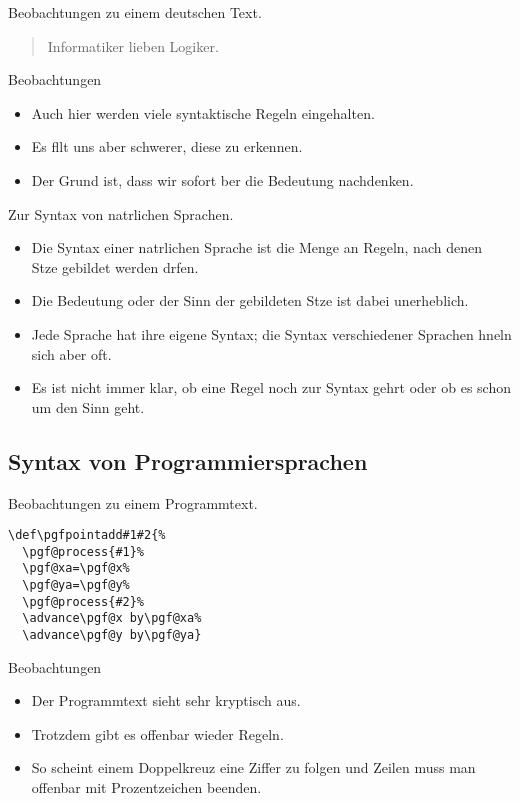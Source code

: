 \begin{frame}{Beobachtungen zu einem deutschen Text.}
  \begin{quotation}
    Informatiker lieben Logiker.
  \end{quotation}

  \bigskip
  \begin{block}{Beobachtungen}
    \begin{itemize}
    \item Auch hier werden viele syntaktische Regeln eingehalten.
    \item Es fllt uns aber \alert{schwerer}, diese zu erkennen.
    \item Der Grund ist, dass wir \alert{sofort ber die Bedeutung
        nachdenken}. 
    \end{itemize}
  \end{block}
\end{frame}

\begin{frame}{Zur Syntax von natrlichen Sprachen.}
  \begin{itemize}
  \item 
    Die \alert{Syntax} einer natrlichen Sprache ist die Menge an
    \alert{Regeln}, nach denen Stze gebildet werden drfen. 
  \item 
    Die \alert{Bedeutung} oder der \alert{Sinn} der gebildeten Stze
    ist dabei unerheblich.
  \item
    Jede Sprache hat ihre eigene Syntax; die Syntax verschiedener
    Sprachen hneln sich aber oft.
  \item
    Es ist nicht immer klar, ob eine Regel noch zur Syntax gehrt
    oder ob es schon um den Sinn geht.

  \end{itemize}
\end{frame}

\subsection{Syntax von Programmiersprachen}

\begin{frame}[fragile]{Beobachtungen zu einem Programmtext.}
  
\begin{verbatim}
\def\pgfpointadd#1#2{%
  \pgf@process{#1}%
  \pgf@xa=\pgf@x%
  \pgf@ya=\pgf@y%
  \pgf@process{#2}%
  \advance\pgf@x by\pgf@xa%
  \advance\pgf@y by\pgf@ya}
\end{verbatim}
  \begin{block}{Beobachtungen}
    \begin{itemize}
    \item Der Programmtext sieht sehr kryptisch aus.
    \item Trotzdem gibt es offenbar wieder Regeln.
    \item So scheint einem Doppelkreuz eine Ziffer zu folgen und
      Zeilen muss man offenbar mit Prozentzeichen beenden.
    \end{itemize}
  \end{block}
\end{frame}


